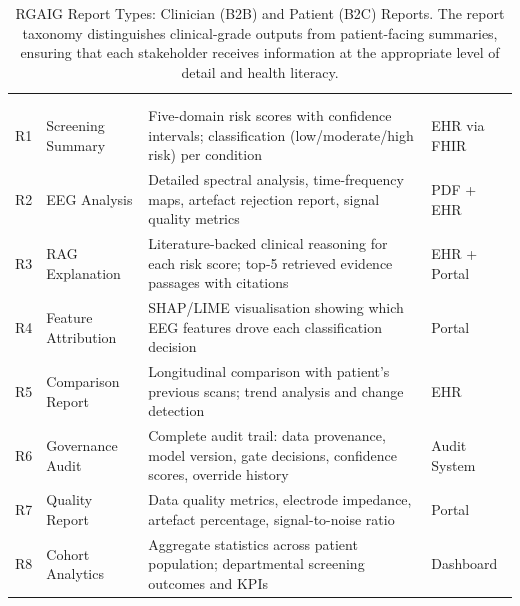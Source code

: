 {\tablestripes\tablefontsize
\begin{xltabular}{\textwidth}{@{} >{\raggedright\arraybackslash}p{0.6cm} >{\raggedright\arraybackslash}p{3.0cm} L >{\raggedright\arraybackslash}p{2.2cm} @{}}
\caption[RGAIG Report Types: Clinician (B2B) and Patient (B2C)]{RGAIG Report Types: Clinician (B2B) and Patient (B2C) Reports. The report taxonomy distinguishes clinical-grade outputs from patient-facing summaries, ensuring that each stakeholder receives information at the appropriate level of detail and health literacy.}\label{tab:report_types} \\
\toprule
\thead{\#} &  &  &  \\
\midrule
\endfirsthead
\toprule
\thead{\#} &  &  &  \\
\midrule
\endhead
\bottomrule
\endlastfoot
{} \\
\addlinespace
R1 & Screening Summary & Five-domain risk scores with confidence intervals; classification (low/moderate/high risk) per condition & EHR via FHIR \\
\addlinespace
R2 & EEG Analysis & Detailed spectral analysis, time-frequency maps, artefact rejection report, signal quality metrics & PDF + EHR \\
\addlinespace
R3 & RAG Explanation & Literature-backed clinical reasoning for each risk score; top-5 retrieved evidence passages with citations & EHR + Portal \\
\addlinespace
R4 & Feature Attribution & SHAP/LIME visualisation showing which EEG features drove each classification decision & Portal \\
\addlinespace
R5 & Comparison Report & Longitudinal comparison with patient's previous scans; trend analysis and change detection & EHR \\
\addlinespace
R6 & Governance Audit & Complete audit trail: data provenance, model version, gate decisions, confidence scores, override history & Audit System \\
\addlinespace
R7 & Quality Report & Data quality metrics, electrode impedance, artefact percentage, signal-to-noise ratio & Portal \\
\addlinespace
R8 & Cohort Analytics & Aggregate statistics across patient population; departmental screening outcomes and KPIs & Dashboard \\
\midrule

\end{xltabular}}
